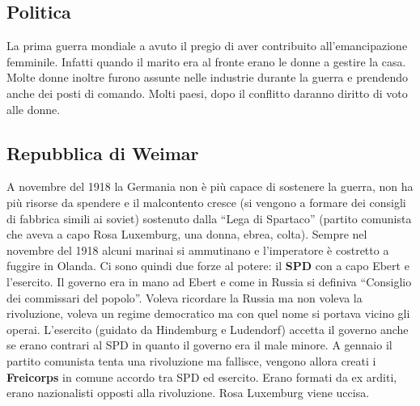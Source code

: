 \subsection{Politica}
La prima guerra mondiale a avuto il pregio di aver contribuito all'emancipazione femminile. Infatti
quando il marito era al fronte erano le donne a gestire la casa. Molte donne inoltre furono assunte
nelle industrie durante la guerra e prendendo anche dei posti di comando. Molti paesi, dopo il
conflitto daranno diritto di voto alle donne.

\subsection{Repubblica di Weimar}
A novembre del 1918 la Germania non è più capace di sostenere la guerra, non ha più risorse da 
spendere e il malcontento cresce (si vengono a formare dei consigli di fabbrica simili ai soviet)
sostenuto dalla ``Lega di Spartaco'' (partito comunista che aveva a capo Rosa Luxemburg, una donna,
ebrea, colta). Sempre nel novembre del 1918 alcuni marinai si ammutinano e l'imperatore è costretto
a fuggire in Olanda. Ci sono quindi due forze al potere: il \textbf{SPD} con a capo Ebert e 
l'esercito. Il governo era in mano ad Ebert e come in Russia si definiva ``Consiglio dei commissari 
del popolo''. Voleva ricordare la Russia ma non voleva la rivoluzione, voleva un regime democratico 
ma con quel nome si portava vicino gli operai. L'esercito (guidato da Hindemburg e Ludendorf) accetta
il governo anche se erano contrari al SPD in quanto il governo era il male minore. A gennaio il
partito comunista tenta una rivoluzione ma fallisce, vengono allora creati i \textbf{Freicorps} in
comune accordo tra SPD ed esercito. Erano formati da ex arditi, erano nazionalisti opposti alla
rivoluzione. Rosa Luxemburg viene uccisa.

